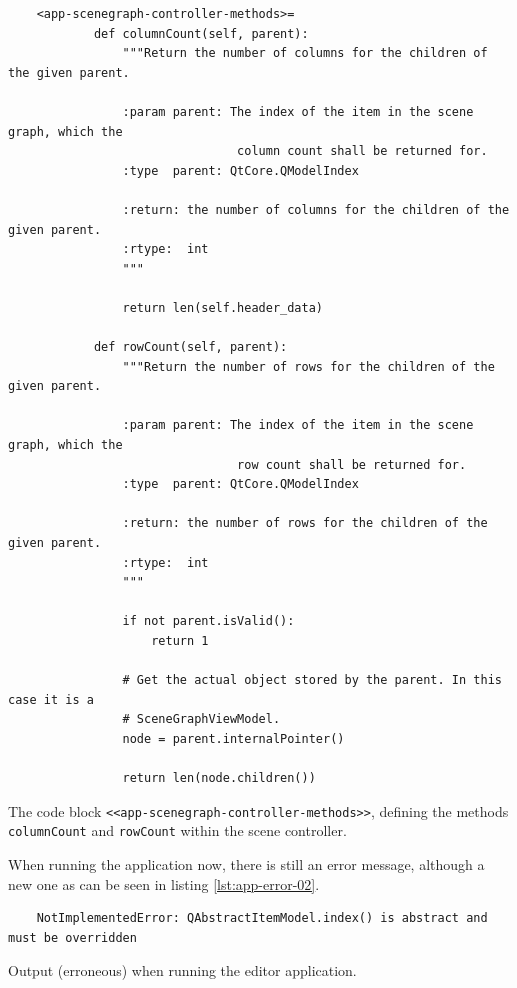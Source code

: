 \documentclass[10pt, openright, notitlepage]{scrreprt}
\begin{document}
\begin{listing}[H]
\begin{verbatim}
    <app-scenegraph-controller-methods>=
            def columnCount(self, parent):
                """Return the number of columns for the children of the given parent.
            
                :param parent: The index of the item in the scene graph, which the
                                column count shall be returned for.
                :type  parent: QtCore.QModelIndex
            
                :return: the number of columns for the children of the given parent.
                :rtype:  int
                """
            
                return len(self.header_data)
    
            def rowCount(self, parent):
                """Return the number of rows for the children of the given parent.
            
                :param parent: The index of the item in the scene graph, which the
                                row count shall be returned for.
                :type  parent: QtCore.QModelIndex
            
                :return: the number of rows for the children of the given parent.
                :rtype:  int
                """
            
                if not parent.isValid():
                    return 1
            
                # Get the actual object stored by the parent. In this case it is a
                # SceneGraphViewModel.
                node = parent.internalPointer()
            
                return len(node.children())
\end{verbatim}
\caption{\label{lst:app-scenegraph-controller-methods-01}
The code block \texttt{<<app-scenegraph-controller-methods>>}, defining the methods \texttt{columnCount} and \texttt{rowCount} within the scene controller.}
\end{listing}

When running the application now, there is still an error message, although a
new one as can be seen in listing \ref{lst:app-error-02}.

\begin{listing}[H]
\begin{verbatim}
    NotImplementedError: QAbstractItemModel.index() is abstract and must be overridden
\end{verbatim}
\caption{\label{lst:app-error-02}
Output (erroneous) when running the editor application.}
\end{listing}
\end{document}
